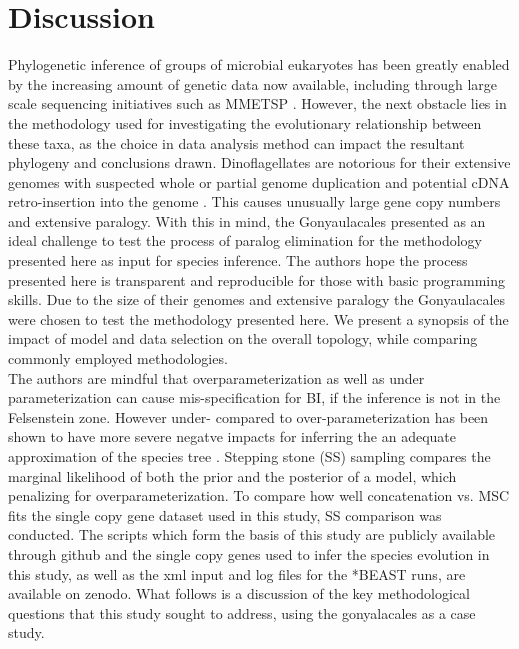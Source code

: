 \documentclass[12pt]{article}
\begin{document}
\section{Discussion}
Phylogenetic inference of groups of microbial eukaryotes has been greatly enabled by the increasing amount of genetic data now available, including through large scale sequencing initiatives such as MMETSP \cite{keeling2014marine}.
However, the next obstacle lies in the methodology used for investigating the evolutionary relationship between these taxa, as the choice in data analysis method can impact the resultant phylogeny and conclusions drawn. 
Dinoflagellates are notorious for their extensive genomes with suspected whole or partial genome duplication and potential cDNA retro-insertion into the genome \cite{van2009florida,beauchemin2012dinoflagellate,slamovits2008widespread,hou2009distinct,lin2011genomic}. 
This causes unusually large gene copy numbers and extensive paralogy. 
With this in mind, the Gonyaulacales presented as an ideal challenge to test the process of paralog elimination for the methodology presented here as input for species inference.  
The authors hope the process presented here is transparent and reproducible for those with basic programming skills. 
Due to the size of their genomes and extensive paralogy the Gonyaulacales were chosen to test the methodology presented here.
We present a synopsis of the impact of model and data selection on the overall topology, while comparing commonly employed methodologies. \\
The authors are mindful that overparameterization as well as under parameterization can cause mis-specification for BI, if the inference is not in the Felsenstein zone. 
However under- compared to over-parameterization has been shown to have  more severe negatve impacts for inferring the an adequate approximation of the species tree \cite{lemmon2004importance}. 
Stepping stone (SS) sampling compares the marginal likelihood of both the prior and the posterior of a model, which penalizing for overparameterization. 
To compare how well concatenation vs. MSC fits the single copy gene dataset used in this study, SS comparison was conducted.
The scripts which form the basis of this study are publicly available through github and the single copy genes used to infer the species evolution in this study, as well as the xml input and log files for the *BEAST runs, are available on zenodo. 
What follows is a discussion of the key methodological questions that this study sought to address, using the gonyalacales as a case study. 
\end{document}
